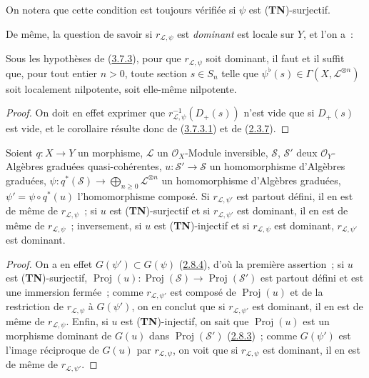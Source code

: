 
On notera que cette condition est toujours vérifiée si $\psi$ est
(\textbf{TN})-surjectif.

De même, la question de savoir si $r_{\mathcal{L},\psi}$ est \emph{dominant}
est locale sur $Y$, et l'on a~:

\begin{corollary}[3.7.5]
\label{II.3.7.5-fr}
Sous les hypothèses de (\hyperref[II.3.7.3-fr]{3.7.3}), pour que
$r_{\mathcal{L},\psi}$ soit dominant, il faut et il suffit que, pour tout
entier $n>0$, toute section $s\in S_n$ telle que
$\psi^\flat(s)\in\Gamma(X,\mathcal{L}^{\otimes n})$ soit localement
nilpotente, soit elle-même nilpotente.
\end{corollary}

\begin{proof}
On doit en effet exprimer que
$r_{\mathcal{L},\psi}^{-1}(D_+(s))$ n'est vide que si $D_+(s)$ est vide,
et le corollaire résulte donc de
(\hyperref[II.3.7.3.1-fr]{3.7.3.1}) et de
(\hyperref[II.2.3.7-fr]{2.3.7}).
\end{proof}

\begin{proposition}[3.7.6]
\label{II.3.7.6-fr}
Soient $q:X\to Y$ un morphisme, $\mathcal{L}$ un $\mathcal{O}_X$-Module
inversible, $\mathcal{S}$, $\mathcal{S}'$ deux $\mathcal{O}_Y$-Algèbres
graduées quasi-cohérentes,
$u:\mathcal{S}'\to\mathcal{S}$ un homomorphisme d'Algèbres graduées,
$\psi:q^*(\mathcal{S})\to\bigoplus_{n\geq0}\mathcal{L}^{\otimes n}$ un
homomorphisme d'Algèbres graduées,
$\psi'=\psi\circ q^*(u)$ l'homomorphisme composé. Si
$r_{\mathcal{L},\psi'}$ est partout défini, il en est de même de
$r_{\mathcal{L},\psi}$~; si $u$ est (\textbf{TN})-surjectif et si
$r_{\mathcal{L},\psi'}$ est dominant, il en est de même de
$r_{\mathcal{L},\psi}$~; inversement, si $u$ est (\textbf{TN})-injectif et si
$r_{\mathcal{L},\psi}$ est dominant, $r_{\mathcal{L},\psi'}$ est dominant.
\end{proposition}

\begin{proof}
On a en effet $G(\psi')\subset G(\psi)$
(\hyperref[II.2.8.4-fr]{2.8.4}), d'où la première assertion~; si $u$ est
(\textbf{TN})-surjectif,
$\operatorname{Proj}(u):\operatorname{Proj}(\mathcal{S})\to
\operatorname{Proj}(\mathcal{S}')$ est partout défini et est une immersion
fermée~; comme $r_{\mathcal{L},\psi'}$ est composé de
$\operatorname{Proj}(u)$ et de la restriction de $r_{\mathcal{L},\psi}$ à
$G(\psi')$, on en conclut que si $r_{\mathcal{L},\psi'}$ est dominant, il en
est de même de $r_{\mathcal{L},\psi}$. Enfin, si $u$ est
(\textbf{TN})-injectif, on sait que $\operatorname{Proj}(u)$ est un morphisme
dominant de $G(u)$ dans $\operatorname{Proj}(\mathcal{S}')$
(\hyperref[II.2.8.3-fr]{2.8.3})~; comme $G(\psi')$ est l'image réciproque de
$G(u)$ par $r_{\mathcal{L},\psi}$, on voit que si $r_{\mathcal{L},\psi}$ est
dominant, il en est de même de $r_{\mathcal{L},\psi'}$.
\end{proof}

